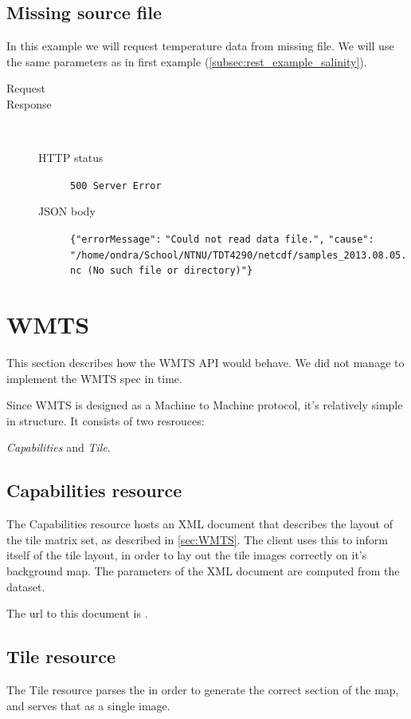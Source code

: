 \documentclass[11pt,a4paper,titlepage,oneside]{report}
\begin{document}
\subsection{Missing source file}
In this example we will request temperature data from missing file. We will use the same parameters as in first example (\ref{subsec:rest_example_salinity}).

\begin{description}
	\item[Request] 
	\item[Response] ~\\
		\begin{description}
			\item[\gls{HTTP} status] \texttt{500 Server Error}
			\item[\gls{JSON} body] \texttt{\{"errorMessage":} \texttt{"Could not read data file.",} \texttt{"cause":} \texttt{"/home/ondra/School/NTNU/TDT4290/netcdf/samples\_2013.08.05.nc (No such file or directory)"\}}
		\end{description}
\end{description}
\section{WMTS}
This section describes how the \gls{WMTS} API would behave. We did not manage to implement the WMTS spec in time.

Since WMTS is designed as a Machine to Machine protocol, it's relatively simple in structure. It consists of two resrouces:

\textit{Capabilities} and \textit{Tile}. 
\subsection{Capabilities resource} 
The Capabilities resource hosts an XML document that describes the layout of the tile matrix set, as described in \ref{sec:WMTS}. The client uses this to inform itself of the tile layout, in order to lay out the tile images correctly on it's background map.  The parameters of the XML document are computed from the dataset.

The url to this document is .

\subsection{Tile resource}
The Tile resource parses the in order to generate the correct section of the map, and serves that as a single image.
\end{document}

